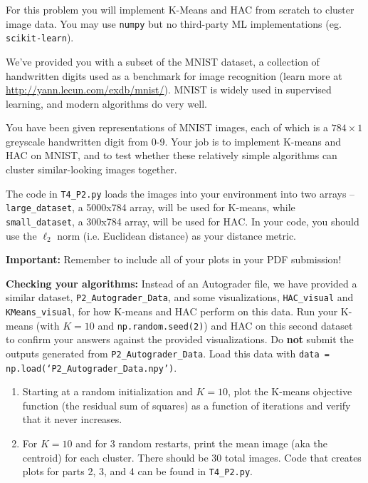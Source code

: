 \documentclass[submit]{harvardml}
\begin{document}

\begin{problem}

For this problem you will implement K-Means and HAC from scratch to cluster image data. You may use \texttt{numpy} but no third-party ML implementations (eg. \texttt{scikit-learn}).

We've provided you with a subset of the MNIST dataset, a collection of
handwritten digits used as a benchmark for image recognition (learn more at
\url{http://yann.lecun.com/exdb/mnist/}). MNIST is widely used in supervised learning, and modern algorithms do very well. 

You have been given
representations of MNIST images, each of which is a $784\times1$
greyscale handwritten digit from 0-9. Your job is to implement K-means and HAC on MNIST, and to test whether these relatively
simple algorithms can cluster similar-looking images together.

The code in \texttt{T4\_P2.py} loads the images into your environment into two arrays -- \texttt{large\_dataset}, a 5000x784 array, will be used for K-means, while \texttt{small\_dataset}, a 300x784 array, will be used for HAC. In your code, you should use the $\ell_2$ norm (i.e. Euclidean distance) as your distance metric.

\textbf{Important:} Remember to include all of your plots in your PDF submission!

\textbf{Checking your algorithms:} Instead of an Autograder file, we have provided a similar dataset, \texttt{P2\_Autograder\_Data}, and some visualizations, \texttt{HAC\_visual} and \texttt{KMeans\_visual}, for how K-means and HAC perform on this data. Run your K-means (with $K=10$ and \texttt{np.random.seed(2)}) and HAC on this second dataset to confirm your answers against the provided visualizations. Do \textbf{not} submit the outputs generated from \texttt{P2\_Autograder\_Data}. Load this data with \texttt{data = np.load(`P2\_Autograder\_Data.npy')}.

\begin{enumerate}

\item Starting at a random initialization and $K = 10$, plot the
  K-means objective function (the residual sum of squares) as a
  function of iterations and verify that it never increases.

\item For $K=10$ and for 3 random restarts, print the mean image (aka
  the centroid) for each cluster. There should be 30 total images. Code 
  that creates plots for parts 2, 3, and 4 can be found in \texttt{T4\_P2.py}.


\end{enumerate}
\end{problem}
\end{document}
